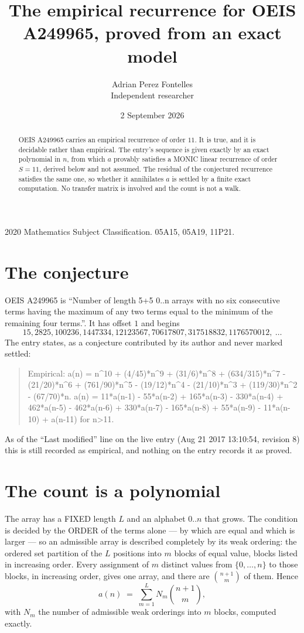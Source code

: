 \documentclass[11pt,a4paper]{article}
\title{The empirical recurrence for OEIS A249965, proved from an exact model}
\author{Adrian Perez Fontelles\\ \small Independent researcher}
\date{2 September 2026}
\theoremstyle{plain}
\theoremstyle{definition}
\begin{document}
\maketitle

\begin{abstract}
OEIS A249965 carries an empirical recurrence of order $11$. It is true, and it is
decidable rather than empirical. The entry's sequence is given exactly by an exact polynomial in $n$, from
which $a$ provably satisfies a MONIC linear recurrence of order $S=11$, derived below and not
assumed. The residual of the conjectured recurrence satisfies the same one, so whether it
annihilates $a$ is settled by a finite exact computation. No transfer matrix is involved and
the count is not a walk.
\end{abstract}

\noindent\small 2020 Mathematics Subject Classification. 05A15, 05A19, 11P21.\normalsize

\section{The conjecture}

OEIS A249965 is ``Number of length 5+5 0..n arrays with no six consecutive terms having the maximum of any two terms equal to the minimum of the remaining four terms.''. It has offset $1$ and begins
\[
15, 2825, 100236, 1447334, 12123567, 70617807, 317518832, 1176570012,\ \dots
\]
The entry states, as a conjecture contributed by its author and never marked settled:
\begin{quote}
Empirical: a(n) = n\^{}10 + (4/45)*n\^{}9 + (31/6)*n\^{}8 + (634/315)*n\^{}7 - (21/20)*n\^{}6 + (761/90)*n\^{}5 - (19/12)*n\^{}4 - (21/10)*n\^{}3 + (119/30)*n\^{}2 - (67/70)*n. a(n) = 11*a(n-1) - 55*a(n-2) + 165*a(n-3) - 330*a(n-4) + 462*a(n-5) - 462*a(n-6) + 330*a(n-7) - 165*a(n-8) + 55*a(n-9) - 11*a(n-10) + a(n-11) for n>11.
\end{quote}
As of the ``Last modified'' line on the live entry (Aug 21 2017 13:10:54, revision 8)
this is still recorded as empirical, and nothing on the entry records it as proved.

\section{The count is a polynomial}

The array has a FIXED length $L$ and an alphabet $0..n$ that grows. The condition is decided by
the ORDER of the terms alone --- by which are equal and which is larger --- so an admissible
array is described completely by its weak ordering: the ordered set partition of the $L$
positions into $m$ blocks of equal value, blocks listed in increasing order. Every assignment
of $m$ distinct values from $\{0,\dots,n\}$ to those blocks, in increasing order, gives one
array, and there are $\binom{n+1}{m}$ of them. Hence
\[
a(n)\;=\;\sum_{m=1}^{L} N_m\binom{n+1}{m},
\]
with $N_m$ the number of admissible weak orderings into $m$ blocks, computed exactly.
\end{document}
